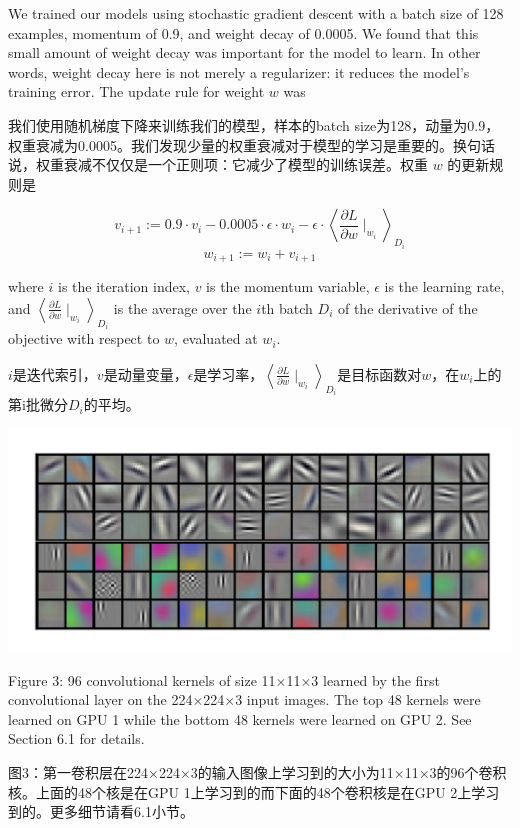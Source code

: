 \documentclass[12pt,a4paper,UTF8,twoside]{book}
\begin{document}
We trained our models using stochastic gradient descent with a batch size of 128 examples, momentum of 0.9, and weight decay of 0.0005. We found that this small amount of weight decay was important for the model to learn. In other words, weight decay here is not merely a regularizer: it reduces the model's training error. The update rule for weight \(w\) was

我们使用随机梯度下降来训练我们的模型，样本的batch size为128，动量为0.9，权重衰减为0.0005。我们发现少量的权重衰减对于模型的学习是重要的。换句话说，权重衰减不仅仅是一个正则项：它减少了模型的训练误差。权重 \(w\) 的更新规则是

\[
v_{i+1} := 0.9 \cdot v_i - 0.0005 \cdot \epsilon \cdot w_i - \epsilon \cdot \left\langle \frac{\partial L}{\partial w} \mid_{w_i} \right\rangle _{D_i}
\]
\[
w_{i+1} := w_i + v_{i+1}
\]

where \(i\) is the iteration index, \(v\) is the momentum variable, \(\epsilon\) is the learning rate, and \(\left\langle \frac{\partial L}{\partial w} \mid_{w_i} \right\rangle _{D_i}\) is the average over the \(i\)th batch \(D_i\) of the derivative of the objective with respect to \(w\), evaluated at \(w_i\).

\(i\)是迭代索引，\(v\)是动量变量，\(\epsilon\)是学习率，\(\left\langle \frac{\partial L}{\partial w} \mid_{w_i} \right\rangle _{D_i}\)是目标函数对\(w\)，在\(w_i\)上的第i批微分\(D_i\)的平均。

\begin{center}\includegraphics[width=0.7\linewidth]{img/01-03} \end{center}

Figure 3: 96 convolutional kernels of size 11×11×3 learned by the first convolutional layer on the 224×224×3 input images. The top 48 kernels were learned on GPU 1 while the bottom 48 kernels were learned on GPU 2. See Section 6.1 for details.

图3：第一卷积层在224×224×3的输入图像上学习到的大小为11×11×3的96个卷积核。上面的48个核是在GPU 1上学习到的而下面的48个卷积核是在GPU 2上学习到的。更多细节请看6.1小节。
\end{document}
